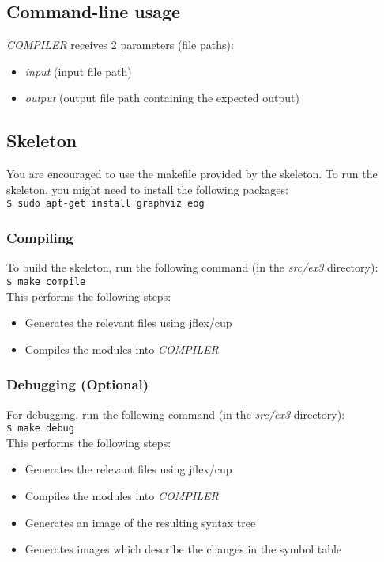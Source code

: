 \documentclass{article}
\begin{document}
\subsection{Command-line usage}
\textit{COMPILER} receives 2 parameters (file paths):
\begin{itemize}
    \item \textit{input} (input file path)
    \item \textit{output} (output file path containing the expected output)
\end{itemize}

\subsection{Skeleton}
You are encouraged to use the makefile provided by the skeleton.
To run the skeleton, you might need to install the following packages: \\
\texttt{\$ sudo apt-get install graphviz eog}
\subsubsection{Compiling}
To build the skeleton, run the following command (in the \textit{src/ex3} directory): \\
\texttt{\$ make compile} \\
This performs the following steps:
\begin{itemize}
    \item Generates the relevant files using jflex/cup
    \item Compiles the modules into \textit{COMPILER}
\end{itemize}

\subsubsection{Debugging (Optional)}
For debugging, run the following command (in the \textit{src/ex3} directory): \\
\texttt{\$ make debug} \\
This performs the following steps:
\begin{itemize}
    \item Generates the relevant files using jflex/cup
    \item Compiles the modules into \textit{COMPILER}
    \item Generates an image of the resulting syntax tree
    \item Generates images which describe the changes in the symbol table
\end{itemize}
\end{document}
